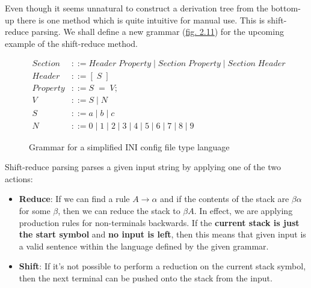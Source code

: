 
Even though it seems unnatural to construct a derivation tree from the bottom-up there is one method which is quite intuitive for manual use. This is shift-reduce parsing. We shall define a new grammar (\hyperref[fig:2.11]{fig. 2.11}) for the upcoming example of the shift-reduce method.

\begin{figure}[h]
    \begin{center}
        \begin{equation}
            \begin{split}
                Section &::= Header\;Property\;|\;Section\;Property\;|\;Section\;Header\\
                Header &::= [\;S\;]\\
                Property &::= S\;=\;V;\\
                V &::= S\;|\;N\\
                S &::= a\;|\;b\;|\;c\\
                N &::= 0\;|\;1\;|\;2\;|\;3\;|\;4\;|\;5\;|\;6\;|\;7\;|\;8\;|\;9
            \end{split}
            \nonumber
        \end{equation}
    \end{center}
    \vspace{-1em}
    \caption{\label{fig:2.11}Grammar for a simplified INI config file type language}
\end{figure}

\pagebreak

Shift-reduce parsing parses a given input string by applying one of the two actions:

\begin{itemize}
    \item \textbf{Reduce}: If we can find a rule $A \rightarrow \alpha$ and if the contents of the stack are $\beta\alpha$ for some $\beta$, then we can reduce the stack to $\beta A$. In effect, we are applying production rules for non-terminals backwards. If the \textbf{current stack is just the start symbol} and \textbf{no input is left}, then this means that given input is a valid sentence within the language defined by the given grammar.
    \item \textbf{Shift}: If it's not possible to perform a reduction on the current stack symbol, then the next terminal can be pushed onto the stack from the input.
\end{itemize}

